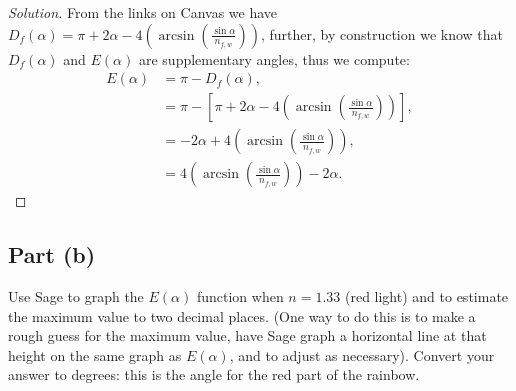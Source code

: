 \documentclass[letterpaper, 12pt]{amsart}
\theoremstyle{definition}  %
\begin{document}
		\begin{proof}[Solution]
		From the links on Canvas we have $D_{f}(\alpha) = \pi + 2 \alpha - 4\left( \arcsin \left( \frac{\sin \alpha}{n_{f,w}} \right) \right)$, further, by construction we know that $D_{f}(\alpha)$ and $E(\alpha)$ are supplementary angles, thus we compute:
			\begin{align*}
				E(\alpha) &= \pi - D_{f}(\alpha), \\
				&= \pi - \left[ \pi + 2 \alpha - 4\left( \arcsin \left( \frac{\sin \alpha}{n_{f,w}} \right) \right) \right], \\
				&= -2 \alpha +  4\left( \arcsin \left( \frac{\sin \alpha}{n_{f,w}} \right) \right), \\
				&= 4\left( \arcsin \left( \frac{\sin \alpha}{n_{f,w}} \right) \right) - 2 \alpha.
			\end{align*}
		\end{proof}
		\pagebreak

		\subsection*{Part (b)}
		Use Sage to graph the $E(\alpha)$ function when $n = 1.33$ (red light) and to estimate the maximum value to two decimal places. 
		(One way to do this is to make a rough guess for the maximum value, have Sage graph a horizontal line at that height on the same graph as $E(\alpha)$, and to adjust as necessary). 
		Convert your answer to degrees: this is the angle for the red part of the rainbow.
\end{document}
